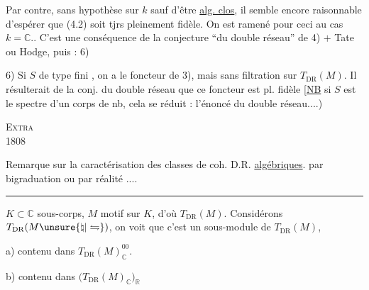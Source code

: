 Par contre, sans hypothèse sur $k$ sauf d'être \uline{alg. clos}, il semble encore raisonnable d'espérer que (4.2) soit tjrs pleinement fidèle.
On est ramené pour ceci au cas $k=\mathbb C$.. C'est une conséquence de la conjecture ``du double réseau'' de 4) $+$ Tate ou Hodge, puis : 6)

6) Si $S$ de type fini , on a le foncteur de 3), mais sans filtration sur $T_{\mathrm{DR}}(M)$. Il résulterait de la conj. du double réseau  que ce foncteur est pl. fidèle
[\uline{NB} si $S$ est le spectre d'un corps de nb, cela se réduit : l'énoncé du double réseau....)
\par\noindent\textsc{}\hfill\textsc{Extra}\\
 1808\hfill{}



Remarque sur la caractérisation des classes de coh. D.R.  \uline{algébriques}. par bigraduation ou par réalité ....
\par\noindent\rule{\linewidth}{0.3pt}\par
$K\subset\mathbb C$ sous-corps, $M$ motif sur $K$, d'où $T_{\mathrm{DR}}(M)$. Considérons $T_{\mathrm{DR}}(M\unsure{\natural|\leftrightharpoons})$, on voit que c'est un sous-module de $T_{\mathrm{DR}}(M)$, 
\par a) contenu dans $T_{\mathrm{DR}}(M)_{\mathbb C}^{00}$.
\par b)  contenu dans $\bigl(T_{\mathrm{DR}}(M)_{\mathbb C}\bigr)_{\mathbb R}$ 

